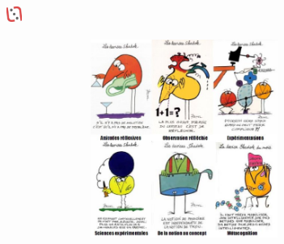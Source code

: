 \documentclass[slidetop,11pt]{beamer}
\def\moreInFrameTitleLeftt{\includegraphics[height=0.5cm]{img/ligueludique-0.png}~~~~~}
\begin{document}
\subsection{\sectionPartIIIc}
\begin{frame}
	\frametitle{\moreInFrameTitleLeftt \sectionPartIIIc}
	\begin{center}
		\includegraphics[height=6.5cm,width=11.6cm]{img/shadoks_devises.png} 
	\end{center}
\end{frame}
\end{document}
